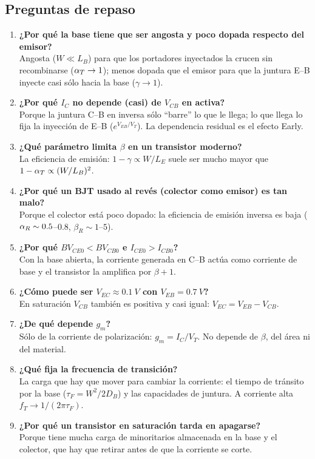 \subsection{Preguntas de repaso}

\begin{enumerate}
  \item \textbf{¿Por qué la base tiene que ser angosta y poco dopada respecto del emisor?}\\
  Angosta ($W\ll L_B$) para que los portadores inyectados la crucen sin recombinarse
  ($\alpha_T\to1$); menos dopada que el emisor para que la juntura E--B inyecte casi sólo hacia la
  base ($\gamma\to1$).
  \item \textbf{¿Por qué $I_C$ no depende (casi) de $V_{CB}$ en activa?}\\
  Porque la juntura C--B en inversa sólo ``barre'' lo que le llega; lo que llega lo fija la
  inyección de E--B ($e^{V_{EB}/V_T}$). La dependencia residual es el efecto Early.
  \item \textbf{¿Qué parámetro limita $\beta$ en un transistor moderno?}\\
  La eficiencia de emisión: $1-\gamma\propto W/L_E$ suele ser mucho mayor que
  $1-\alpha_T\propto(W/L_B)^2$.
  \item \textbf{¿Por qué un BJT usado al revés (colector como emisor) es tan malo?}\\
  Porque el colector está poco dopado: la eficiencia de emisión inversa es baja
  ($\alpha_R\sim0.5$--$0.8$, $\beta_R\sim1$--$5$).
  \item \textbf{¿Por qué $BV_{CE0}<BV_{CB0}$ e $I_{CE0}>I_{CB0}$?}\\
  Con la base abierta, la corriente generada en C--B actúa como corriente de base y el
  transistor la amplifica por $\beta+1$.
  \item \textbf{¿Cómo puede ser $V_{EC}\approx\SI{0.1}{V}$ con $V_{EB}=\SI{0.7}{V}$?}\\
  En saturación $V_{CB}$ también es positiva y casi igual: $V_{EC}=V_{EB}-V_{CB}$.
  \item \textbf{¿De qué depende $g_m$?}\\
  Sólo de la corriente de polarización: $g_m=I_C/V_T$. No depende de $\beta$, del área ni del
  material.
  \item \textbf{¿Qué fija la frecuencia de transición?}\\
  La carga que hay que mover para cambiar la corriente: el tiempo de tránsito por la base
  ($\tau_F=W^2/2D_B$) y las capacidades de juntura. A corriente alta $f_T\to1/(2\pi\tau_F)$.
  \item \textbf{¿Por qué un transistor en saturación tarda en apagarse?}\\
  Porque tiene mucha carga de minoritarios almacenada en la base y el colector, que hay que
  retirar antes de que la corriente se corte.
\end{enumerate}

